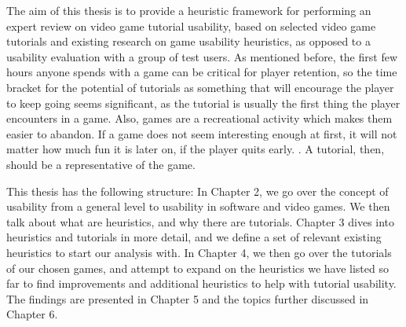 The aim of this thesis is to provide a heuristic framework for performing an expert review on video game tutorial usability, based on selected video game tutorials and existing research on game usability heuristics, as opposed to a usability evaluation with a group of test users. As mentioned before, the first few hours anyone spends with a game can be critical for player retention, so the time bracket for the potential of tutorials as something that will encourage the player to keep going seems significant, as the tutorial is usually the first thing the player encounters in a game. Also, games are a recreational activity which makes them easier to abandon. If a game does not seem interesting enough at first, it will not matter how much fun it is later on, if the player quits early. \cite{Cheung2014}. A tutorial, then, should be a representative of the game.

This thesis has the following structure: In Chapter 2, we go over the concept of usability from a general level to usability in software and video games. We then talk about what are heuristics, and why there are tutorials. Chapter 3 dives into heuristics and tutorials in more detail, and we define a set of relevant existing heuristics to start our analysis with. In Chapter 4, we then go over the tutorials of our chosen games, and attempt to expand on the heuristics we have listed so far to find improvements and additional heuristics to help with tutorial usability. The findings are presented in Chapter 5 and the topics further discussed in Chapter 6.